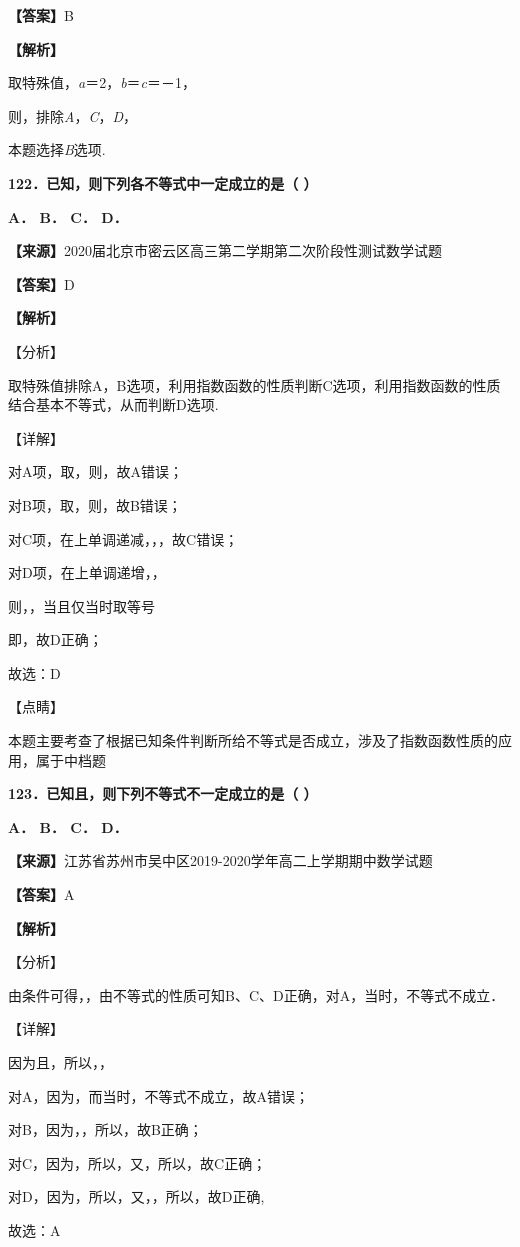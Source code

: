 \documentclass[
]{article}
\begin{document}
\textbf{【答案】}B

\textbf{【解析】}

取特殊值，\emph{a}＝2，\emph{b}＝\emph{c}＝－1，

则，排除\emph{A}，\emph{C}，\emph{D}，

本题选择\emph{B}选项.

\textbf{122．已知，则下列各不等式中一定成立的是（ ）}

\textbf{A． B． C． D．}

\textbf{【来源】}2020届北京市密云区高三第二学期第二次阶段性测试数学试题

\textbf{【答案】}D

\textbf{【解析】}

【分析】

取特殊值排除A，B选项，利用指数函数的性质判断C选项，利用指数函数的性质结合基本不等式，从而判断D选项.

【详解】

对A项，取，则，故A错误；

对B项，取，则，故B错误；

对C项，在上单调递减，，，故C错误；

对D项，在上单调递增，，

则，，当且仅当时取等号

即，故D正确；

故选：D

【点睛】

本题主要考查了根据已知条件判断所给不等式是否成立，涉及了指数函数性质的应用，属于中档题

\textbf{123．已知且，则下列不等式不一定成立的是（ ）}

\textbf{A． B． C． D．}

\textbf{【来源】}江苏省苏州市吴中区2019-2020学年高二上学期期中数学试题

\textbf{【答案】}A

\textbf{【解析】}

【分析】

由条件可得，，由不等式的性质可知B、C、D正确，对A，当时，不等式不成立．

【详解】

因为且，所以，，

对A，因为，而当时，不等式不成立，故A错误；

对B，因为，，所以，故B正确；

对C，因为，所以，又，所以，故C正确；

对D，因为，所以，又，，所以，故D正确,

故选：A
\end{document}
